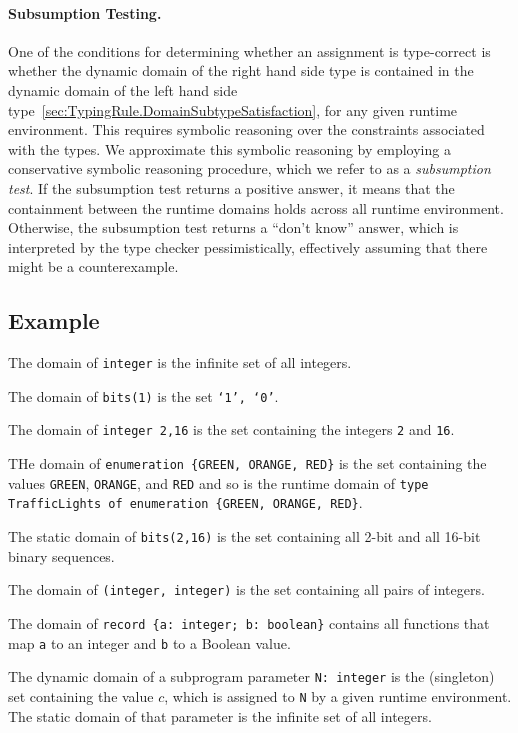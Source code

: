 \documentclass{book}
\begin{document}
  \paragraph{Subsumption Testing.}
  One of the conditions for determining whether an assignment is type-correct is whether the dynamic domain of the
  right hand side type is contained in the dynamic domain of the left hand side type~\ref{sec:TypingRule.DomainSubtypeSatisfaction},
  for any given runtime environment.
  This requires symbolic reasoning over the constraints associated with the types.
  We approximate this symbolic reasoning by employing a conservative symbolic reasoning procedure,
  which we refer to as a \emph{subsumption test}.
  If the subsumption test returns a positive answer, it means that the containment between the runtime domains holds across all
  runtime environment.
  Otherwise, the subsumption test returns a ``don't know'' answer, which is interpreted by the type checker pessimistically,
  effectively assuming that there might be a counterexample.

  \subsection{Example}
  The domain of \texttt{integer} is the infinite set of all integers.

  The domain of \texttt{bits(1)} is the set \texttt{{‘1’, ‘0’}}.

  The domain of \texttt{integer {2,16}} is the set containing the integers \texttt{2} and \texttt{16}.

  THe domain of \texttt{enumeration \{GREEN, ORANGE, RED\}} is the set containing the values
  \texttt{GREEN}, \texttt{ORANGE}, and \texttt{RED} and so is the runtime domain
  of \texttt{type TrafficLights of enumeration \{GREEN, ORANGE, RED\}}.

  The static domain of \texttt{bits({2,16})} is the set containing all 2-bit and all 16-bit binary sequences.

  The domain of \texttt{(integer, integer)} is the set containing all pairs of integers.

  The domain of \texttt{record \{a: integer;  b: boolean\}} contains all functions that map \texttt{a} to an integer and \texttt{b} to a Boolean value.

  The dynamic domain of a subprogram parameter \texttt{N: integer} is the (singleton) set containing the value $c$,
  which is assigned to \texttt{N} by a given runtime environment. The static domain of that parameter
  is the infinite set of all integers.
\end{document}
